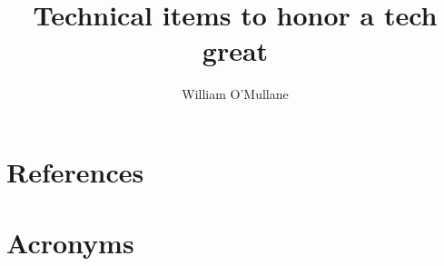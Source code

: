 \documentclass[DM,authoryear,toc]{lsstdoc}
\title{Technical items to honor a tech great}
\author{%
William O'Mullane
}
\date{\vcsDate}
\begin{document}
\maketitle



\appendix
\section{References} \label{sec:bib}


\section{Acronyms} \label{sec:acronyms}

\end{document}
